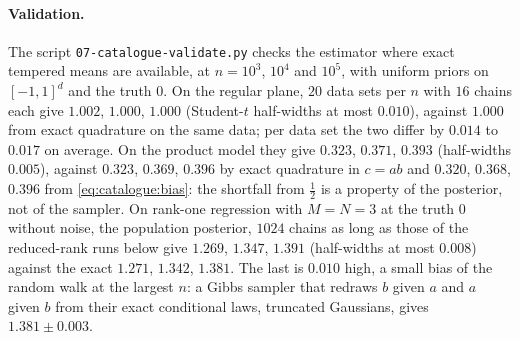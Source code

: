 \begin{refsection}
\paragraph{Validation.} The script \texttt{07-catalogue-validate.py} checks the estimator where exact tempered means are available, at $n=10^3$, $10^4$ and $10^5$, with uniform priors on $[-1,1]^d$ and the truth $0$. On the regular plane, $20$ data sets per $n$ with $16$ chains each give $1.002$, $1.000$, $1.000$ (Student-$t$ half-widths at most $0.010$), against $1.000$ from exact quadrature on the same data; per data set the two differ by $0.014$ to $0.017$ on average. On the product model they give $0.323$, $0.371$, $0.393$ (half-widths $0.005$), against $0.323$, $0.369$, $0.396$ by exact quadrature in $c=ab$ and $0.320$, $0.368$, $0.396$ from \eqref{eq:catalogue:bias}: the shortfall from $\frac12$ is a property of the posterior, not of the sampler. On rank-one regression with $M=N=3$ at the truth $0$ without noise, the population posterior, $1024$ chains as long as those of the reduced-rank runs below give $1.269$, $1.347$, $1.391$ (half-widths at most $0.008$) against the exact $1.271$, $1.342$, $1.381$. The last is $0.010$ high, a small bias of the random walk at the largest $n$: a Gibbs sampler that redraws $b$ given $a$ and $a$ given $b$ from their exact conditional laws, truncated Gaussians, gives $1.381\pm0.003$.


\end{refsection}
